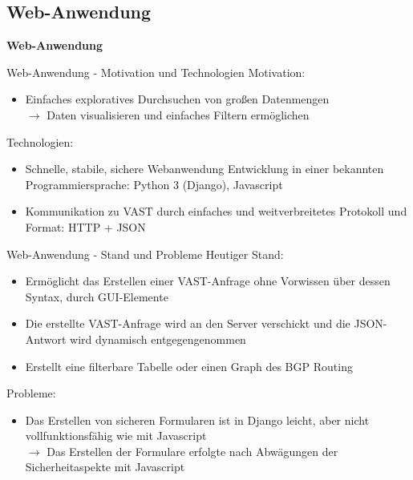 \documentclass[9pt]{beamer}
\begin{document}
\subsection{Web-Anwendung}

	\begin{frame}{}
		\begin{center}
			\LARGE \textbf{Web-Anwendung}
		\end{center}
	\end{frame}

\begin{frame}{Web-Anwendung - Motivation und Technologien}{}
	Motivation:
	\begin{itemize}
		\item Einfaches exploratives Durchsuchen von großen Datenmengen\\
			$\rightarrow$ Daten visualisieren und einfaches Filtern ermöglichen
	\end{itemize}
	Technologien:
	\begin{itemize}
		\item Schnelle, stabile, sichere Webanwendung Entwicklung in einer bekannten Programmiersprache:  Python 3 (Django), Javascript			
		\item Kommunikation zu VAST durch einfaches  und weitverbreitetes Protokoll und Format: HTTP + JSON
	\end{itemize}
\end{frame}

\begin{frame}{Web-Anwendung - Stand und Probleme}
	Heutiger Stand:
	\begin{itemize}
		\item Ermöglicht das Erstellen einer VAST-Anfrage ohne Vorwissen über dessen Syntax, durch GUI-Elemente 
		\item Die erstellte VAST-Anfrage wird an den Server verschickt und  die JSON-Antwort wird dynamisch entgegengenommen 
		\item Erstellt eine filterbare Tabelle oder einen Graph des BGP Routing
	\end{itemize}
	Probleme:
	\begin{itemize}
		\item Das Erstellen von sicheren Formularen ist in Django leicht, aber nicht vollfunktionsfähig wie mit Javascript \\
		$\rightarrow$ Das Erstellen der Formulare erfolgte nach Abwägungen der Sicherheitaspekte mit Javascript
	\end{itemize}
\end{frame}
\end{document}
